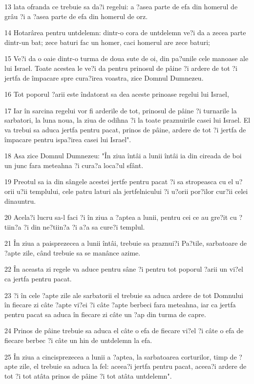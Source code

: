 \par 13 lata ofranda ce trebuie sa da?i regelui: a ?asea parte de efa din homerul de grâu ?i a ?asea parte de efa din homerul de orz.
\par 14 Hotarârea pentru untdelemn: dintr-o cora de untdelemn ve?i da a zecea parte dintr-un bat; zece baturi fac un homer, caci homerul are zece baturi;
\par 15 Ve?i da o oaie dintr-o turma de doua sute de oi, din pa?unile cele manoase ale lui Israel. Toate acestea le ve?i da pentru prinosul de pâine ?i ardere de tot ?i jertfa de împacare spre cura?irea voastra, zice Domnul Dumnezeu.
\par 16 Tot poporul ?arii este îndatorat sa dea aceste prinoase regelui lui Israel,
\par 17 Iar în sarcina regelui vor fi arderile de tot, prinosul de pâine ?i turnarile la sarbatori, la luna noua, la ziua de odihna ?i la toate praznuirile casei lui Israel. El va trebui sa aduca jertfa pentru pacat, prinos de pâine, ardere de tot ?i jertfa de împacare pentru ispa?irea casei lui Israel".
\par 18 Asa zice Domnul Dumnezeu: "În ziua întâi a lunii întâi ia din cireada de boi un junc fara meteahna ?i cura?a loca?ul sfânt.
\par 19 Preotul sa ia din sângele acestei jertfe pentru pacat ?i sa stropeasca cu el u?orii u?ii templului, cele patru laturi ala jertfelnicului ?i u?orii por?ilor cur?ii celei dinauntru.
\par 20 Acela?i lucru sa-l faci ?i în ziua a ?aptea a lunii, pentru cei ce au gre?it cu ?tiin?a ?i din ne?tiin?a ?i a?a sa cure?i templul.
\par 21 În ziua a paisprezecea a lunii întâi, trebuie sa praznui?i Pa?tile, sarbatoare de ?apte zile, când trebuie sa se manânce azime.
\par 22 În aceasta zi regele va aduce pentru sâne ?i pentru tot poporul ?arii un vi?el ca jertfa pentru pacat.
\par 23 ?i în cele ?apte zile ale sarbatorii el trebuie sa aduca ardere de tot Domnului în fiecare zi câte ?apte vi?ei ?i câte ?apte berbeci fara meteahna, iar ca jertfa pentru pacat sa aduca în fiecare zi câte un ?ap din turma de capre.
\par 24 Prinos de pâine trebuie sa aduca el câte o efa de fiecare vi?el ?i câte o efa de fiecare berbec ?i câte un hin de untdelemn la efa.
\par 25 În ziua a cincisprezecea a lunii a ?aptea, la sarbatoarea corturilor, timp de ?apte zile, el trebuie sa aduca la fel: aceea?i jertfa pentru pacat, aceea?i ardere de tot ?i tot atâta prinos de pâine ?i tot atâta untdelemn".

